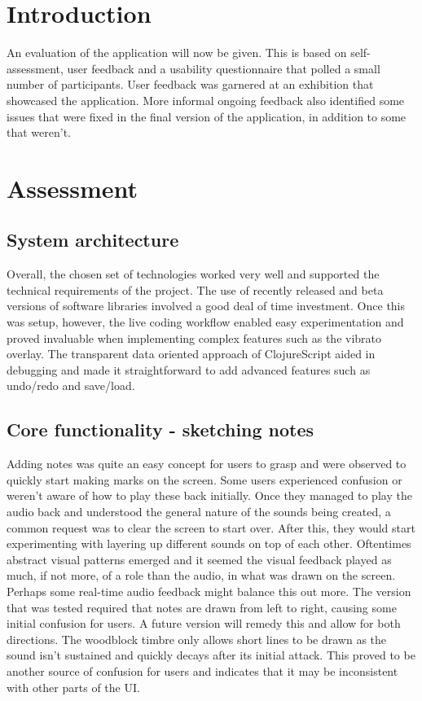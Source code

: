 \documentclass[12pt]{report}
\begin{document}
\chapter{Introduction}
\label{sec:org700267d}
An evaluation of the application will now be given. This is based on
self-assessment, user feedback and a usability questionnaire that polled a small
number of participants. User feedback was garnered at an exhibition that
showcased the application. More informal ongoing feedback also identified some
issues that were fixed in the final version of the application, in addition to
some that weren't.

\chapter{Assessment}
\label{sec:orgdcc7331}
\section{System architecture}
\label{sec:orgfd45488}
Overall, the chosen set of technologies worked very well and supported the
technical requirements of the project. The use of recently released and beta
versions of software libraries involved a good deal of time investment. Once
this was setup, however, the live coding workflow enabled easy experimentation
and proved invaluable when implementing complex features such as the vibrato
overlay. The transparent data oriented approach of ClojureScript aided in
debugging and made it straightforward to add advanced features such as undo/redo
and save/load.

\section{Core functionality - sketching notes}
\label{sec:org61160a8}
Adding notes was quite an easy concept for users to grasp and were observed to
quickly start making marks on the screen. Some users experienced confusion or
weren't aware of how to play these back initially. Once they managed to play the
audio back and understood the general nature of the sounds being created, a
common request was to clear the screen to start over. After this, they would
start experimenting with layering up different sounds on top of each other.
Oftentimes abstract visual patterns emerged and it seemed the visual feedback
played as much, if not more, of a role than the audio, in what was drawn on the
screen. Perhaps some real-time audio feedback might balance this out more. The
version that was tested required that notes are drawn from left to right,
causing some initial confusion for users. A future version will remedy this and
allow for both directions. The woodblock timbre only allows short lines to be
drawn as the sound isn't sustained and quickly decays after its initial attack.
This proved to be another source of confusion for users and indicates that it
may be inconsistent with other parts of the UI.
\end{document}
